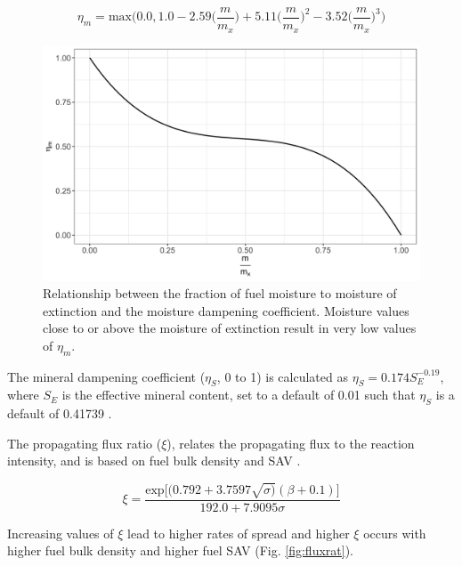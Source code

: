 \documentclass[a4paper, 12pt] {report}
\begin{document}
\begin{equation} 
	\eta_m = \text{max}\Bigg(0.0, 1.0 - 2.59\Big(\frac{m}{m_x}\Big) + 5.11\Big(\frac{m}{m_x}\Big)^2 - 3.52\Big(\frac{m}{m_x}\Big)^3\Bigg)
\end{equation}

\begin{figure}
	\includegraphics[width=\linewidth]{figures/moist.png}
	\caption{Relationship between the fraction of fuel moisture to moisture of extinction and the moisture dampening coefficient. Moisture values close to or above the moisture of extinction result in very low values of $\eta_m$.}
	\label{fig:moistfig}
\end{figure}

The mineral dampening coefficient ($\eta_S$, 0 to 1) is calculated as $\eta_S = 0.174S_E^{-0.19}$, where $S_E$ is the effective mineral content, set to a default of 0.01 such that $\eta_S$ is a default of 0.41739 \cite{pyneIntroductionWildlandFire1996}.

The propagating flux ratio ($\xi$), relates the propagating flux to the reaction intensity, and is based on fuel bulk density and SAV \cite{rothermelMathematicalModelPredicting1972}.

\begin{equation}
	\xi = \frac{\text{exp}\Big[(0.792 + 3.7597\sqrt{\sigma)}(\beta + 0.1)\Big]}{192.0 + 7.9095\sigma}
\end{equation}

Increasing values of $\xi$ lead to higher rates of spread and higher $\xi$ occurs with higher fuel bulk density and higher fuel SAV (Fig. \ref{fig:fluxrat}).
\end{document}
